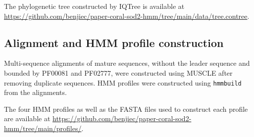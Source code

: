 The phylogenetic tree constructed by IQTree \cite{iqtree} is available at
\url{https://github.com/benjiec/paper-coral-sod2-hmm/tree/main/data/tree.contree}.


\subsection*{Alignment and HMM profile construction}

Multi-sequence alignments of mature sequences, without the leader sequence and
bounded by PF00081 and PF02777, were constructed using MUSCLE \cite{muscle}
after removing duplicate sequences. HMM profiles were constructed using
\texttt{hmmbuild} \cite{eddy2011hmmer} from the alignments.

The four HMM profiles as well as the FASTA files used to construct each profile
are available at
\url{https://github.com/benjiec/paper-coral-sod2-hmm/tree/main/profiles/}.

